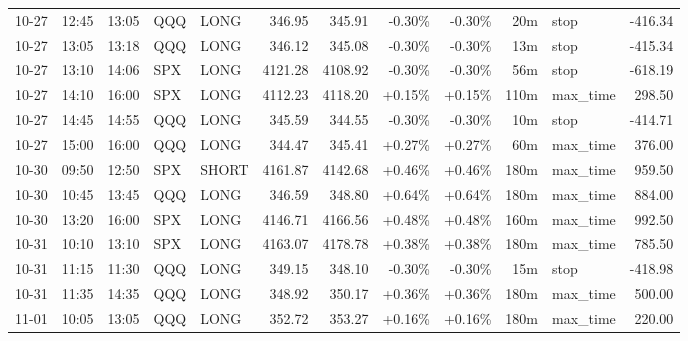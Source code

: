 \documentclass[11pt,a4paper,twoside]{article}
\begin{document}
\begin{center}
\begin{longtable}{>{\color{txtmain}}l l l l l r r r r r >{\color{txtmain}}l r}
10-27 & 12:45 & 13:05 & QQQ & LONG & 346.95 & 345.91 & \textcolor{lossred}{-0.30\%} & \textcolor{lossred}{-0.30\%} & 20m & stop & \textcolor{lossred}{-416.34} \\
10-27 & 13:05 & 13:18 & QQQ & LONG & 346.12 & 345.08 & \textcolor{lossred}{-0.30\%} & \textcolor{lossred}{-0.30\%} & 13m & stop & \textcolor{lossred}{-415.34} \\
10-27 & 13:10 & 14:06 & SPX & LONG & 4121.28 & 4108.92 & \textcolor{lossred}{-0.30\%} & \textcolor{lossred}{-0.30\%} & 56m & stop & \textcolor{lossred}{-618.19} \\
10-27 & 14:10 & 16:00 & SPX & LONG & 4112.23 & 4118.20 & \textcolor{wingreen}{+0.15\%} & \textcolor{wingreen}{+0.15\%} & 110m & max\_time & \textcolor{wingreen}{298.50} \\
10-27 & 14:45 & 14:55 & QQQ & LONG & 345.59 & 344.55 & \textcolor{lossred}{-0.30\%} & \textcolor{lossred}{-0.30\%} & 10m & stop & \textcolor{lossred}{-414.71} \\
10-27 & 15:00 & 16:00 & QQQ & LONG & 344.47 & 345.41 & \textcolor{wingreen}{+0.27\%} & \textcolor{wingreen}{+0.27\%} & 60m & max\_time & \textcolor{wingreen}{376.00} \\
10-30 & 09:50 & 12:50 & SPX & SHORT & 4161.87 & 4142.68 & \textcolor{wingreen}{+0.46\%} & \textcolor{wingreen}{+0.46\%} & 180m & max\_time & \textcolor{wingreen}{959.50} \\
10-30 & 10:45 & 13:45 & QQQ & LONG & 346.59 & 348.80 & \textcolor{wingreen}{+0.64\%} & \textcolor{wingreen}{+0.64\%} & 180m & max\_time & \textcolor{wingreen}{884.00} \\
10-30 & 13:20 & 16:00 & SPX & LONG & 4146.71 & 4166.56 & \textcolor{wingreen}{+0.48\%} & \textcolor{wingreen}{+0.48\%} & 160m & max\_time & \textcolor{wingreen}{992.50} \\
10-31 & 10:10 & 13:10 & SPX & LONG & 4163.07 & 4178.78 & \textcolor{wingreen}{+0.38\%} & \textcolor{wingreen}{+0.38\%} & 180m & max\_time & \textcolor{wingreen}{785.50} \\
10-31 & 11:15 & 11:30 & QQQ & LONG & 349.15 & 348.10 & \textcolor{lossred}{-0.30\%} & \textcolor{lossred}{-0.30\%} & 15m & stop & \textcolor{lossred}{-418.98} \\
10-31 & 11:35 & 14:35 & QQQ & LONG & 348.92 & 350.17 & \textcolor{wingreen}{+0.36\%} & \textcolor{wingreen}{+0.36\%} & 180m & max\_time & \textcolor{wingreen}{500.00} \\
11-01 & 10:05 & 13:05 & QQQ & LONG & 352.72 & 353.27 & \textcolor{wingreen}{+0.16\%} & \textcolor{wingreen}{+0.16\%} & 180m & max\_time & \textcolor{wingreen}{220.00} \\

\end{longtable}
\end{center}
\end{document}
